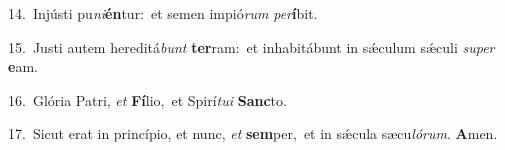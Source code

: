 {\numbfont\textcolor{\numbcolor}{14.}}~Injústi pu\-\textit{ni}\-\textbf{én}tur:~\star et semen impió\textit{rum} \textit{per}\-\textbf{í}bit.\par
{\numbfont\textcolor{\numbcolor}{15.}}~Justi autem hereditá\textit{bunt} \textbf{ter}\-ram:~\star et inhabitábunt in sǽculum sǽculi \textit{su}\-\textit{per} \textbf{e}\-am.\par
{\numbfont\textcolor{\numbcolor}{16.}}~Glória Patri, \textit{et} \textbf{Fí}\-lio,~\star et Spirí\-\textit{tu}\-\textit{i} \textbf{Sanc}\-to.\par
{\numbfont\textcolor{\numbcolor}{17.}}~Sicut erat in princípio, et nunc, \textit{et} \textbf{sem}\-per,~\star et in sǽcula sæcu\-\textit{ló}\-\textit{rum}. \textbf{A}\-men.\par
